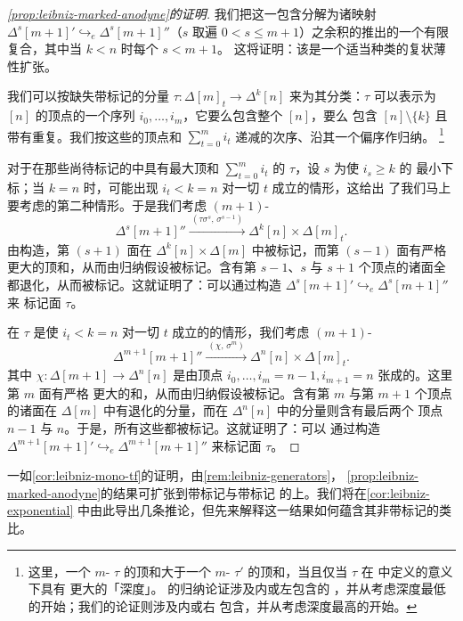 \begin{proof}[\cref{prop:leibniz-marked-anodyne}的证明]
我们把这一包含分解为诸映射
$\Delta^{s}[m+1]'\hookrightarrow_{e}\Delta^{s}[m+1]''$（$s$ 取遍
$0<s\le m+1$）之余积的推出的一个有限复合，其中当 $k<n$ 时每个 $s<m+1$。
这将证明：该\trLeibnizProduct{}是一个适当种类的复状薄性扩张。

我们可以按缺失带标记\trSimplex{}的分量
$\tau\colon\Delta[m]_{t}\to\Delta^{k}[n]$ 来为其分类：$\tau$ 可以表示为
$[n]$ 的顶点的一个序列 $i_{0},\dots,i_{m}$，它要么包含整个 $[n]$，要么
包含 $[n]\setminus\{k\}$ 且带有重复。我们按这些\trSimplex{}的顶点和
$\sum_{t=0}^{m}i_{t}$ 递减的次序、沿其一个偏序作归纳。%
\footnote{这里，一个 $m$-\trSimplex{} $\tau$ 的顶和大于一个 $m$-\trSimplex{}
$\tau'$ 的顶和，当且仅当 $\tau$ 在 \cite[68]{bib129} 中定义的意义下具有
更大的「深度」。\cite[\S5.2]{bib129} 的归纳论证涉及内或左\trHorn{}包含的%
\trLeibnizProduct，并从考虑深度最低的\trSimplex{}开始；我们的论证则涉及内或右%
\trHorn{}包含，并从考虑深度最高的\trSimplex{}开始。}

对于在那些尚待标记的\trSimplex{}中具有最大顶和
$\sum_{t=0}^{m}i_{t}$ 的\trSimplex{} $\tau$，设 $s$ 为使 $i_{s}\ge k$ 的
最小下标；当 $k=n$ 时，可能出现 $i_{t}<k=n$ 对一切 $t$ 成立的情形，这给出
了我们马上要考虑的第二种情形。于是我们考虑 $(m+1)$-\trSimplex{}
\[ \Delta^{s}[m+1]''\xrightarrow{\ (\tau\sigma^{s},\,\sigma^{s-1})\ }
   \Delta^{k}[n]\times\Delta[m]_{t}\mbox{.} \]
由构造，第 $(s+1)$ 面在 $\Delta^{k}[n]\times\Delta[m]$ 中被标记，而第
$(s-1)$ 面有严格更大的顶和，从而由归纳假设被标记。含有第 $s-1$、$s$ 与
$s+1$ 个顶点的诸面全都退化，从而被标记。这就证明了：可以通过构造%
\trExtension{} $\Delta^{s}[m+1]'\hookrightarrow_{e}\Delta^{s}[m+1]''$ 来
标记面 $\tau$。

在 $\tau$ 是使 $i_{t}<k=n$ 对一切 $t$ 成立的\trSimplex{}的情形，我们考虑
$(m+1)$-\trSimplex{}
\[ \Delta^{m+1}[m+1]''\xrightarrow{\ (\chi,\,\sigma^{m})\ }
   \Delta^{n}[n]\times\Delta[m]_{t}\mbox{.} \]
其中 $\chi\colon\Delta[m+1]\to\Delta^{n}[n]$ 是由顶点
$i_{0},\dots,i_{m}=n-1,i_{m+1}=n$ 张成的\trSimplex。这里第 $m$ 面有严格
更大的和，从而由归纳假设被标记。含有第 $m$ 与第 $m+1$ 个顶点的诸面在
$\Delta[m]$ 中有退化的分量，而在 $\Delta^{n}[n]$ 中的分量则含有最后两个
顶点 $n-1$ 与 $n$。于是，所有这些\trSimplex{}都被标记。这就证明了：可以
通过构造\trExtension{}
$\Delta^{m+1}[m+1]'\hookrightarrow_{e}\Delta^{m+1}[m+1]''$ 来标记面 $\tau$。
\end{proof}

一如\cref{cor:leibniz-mono-tf}的证明，由\cref{rem:leibniz-generators}，
\cref{prop:leibniz-marked-anodyne}的结果可扩张到带标记\trAnodyneExtension{}与带标记%
\trMonomorphism{}的\trLeibnizProduct{}上。我们将在\cref{cor:leibniz-exponential}
中由此导出几条推论，但先来解释这一结果如何蕴含其非带标记的类比。

